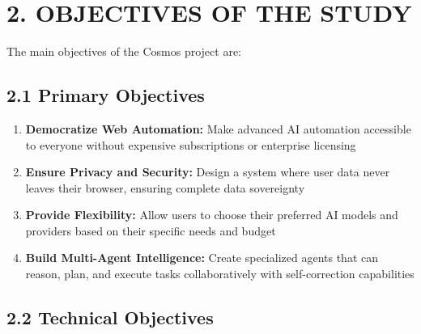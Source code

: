 \documentclass[12pt,a4paper]{article}
\begin{document}
\newpage

\section*{\textbf{2. OBJECTIVES OF THE STUDY}}

The main objectives of the Cosmos project are:

\vspace{0.3cm}

\subsection*{\textbf{2.1 Primary Objectives}}

\begin{enumerate}
    \item \textbf{Democratize Web Automation:} Make advanced AI automation accessible to everyone without expensive subscriptions or enterprise licensing
    
    \item \textbf{Ensure Privacy and Security:} Design a system where user data never leaves their browser, ensuring complete data sovereignty
    
    \item \textbf{Provide Flexibility:} Allow users to choose their preferred AI models and providers based on their specific needs and budget
    
    \item \textbf{Build Multi-Agent Intelligence:} Create specialized agents that can reason, plan, and execute tasks collaboratively with self-correction capabilities
\end{enumerate}

\vspace{0.3cm}

\subsection*{\textbf{2.2 Technical Objectives}}
\end{document}
